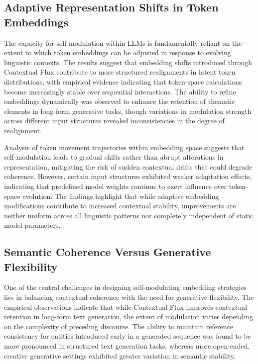 \documentclass{article}
\begin{document}
\subsection{Adaptive Representation Shifts in Token Embeddings}

The capacity for self-modulation within LLMs is fundamentally reliant on the extent to which token embeddings can be adjusted in response to evolving linguistic contexts. The results suggest that embedding shifts introduced through Contextual Flux contribute to more structured realignments in latent token distributions, with empirical evidence indicating that token-space calculations become increasingly stable over sequential interactions. The ability to refine embeddings dynamically was observed to enhance the retention of thematic elements in long-form generative tasks, though variations in modulation strength across different input structures revealed inconsistencies in the degree of realignment. 

Analysis of token movement trajectories within embedding space suggests that self-modulation leads to gradual shifts rather than abrupt alterations in representation, mitigating the risk of sudden contextual drifts that could degrade coherence. However, certain input structures exhibited weaker adaptation effects, indicating that predefined model weights continue to exert influence over token-space evolution. The findings highlight that while adaptive embedding modifications contribute to increased contextual stability, improvements are neither uniform across all linguistic patterns nor completely independent of static model parameters.

\subsection{Semantic Coherence Versus Generative Flexibility}

One of the central challenges in designing self-modulating embedding strategies lies in balancing contextual coherence with the need for generative flexibility. The empirical observations indicate that while Contextual Flux improves contextual retention in long-form text generation, the extent of modulation varies depending on the complexity of preceding discourse. The ability to maintain reference consistency for entities introduced early in a generated sequence was found to be more pronounced in structured text generation tasks, whereas more open-ended, creative generative settings exhibited greater variation in semantic stability.
\end{document}
